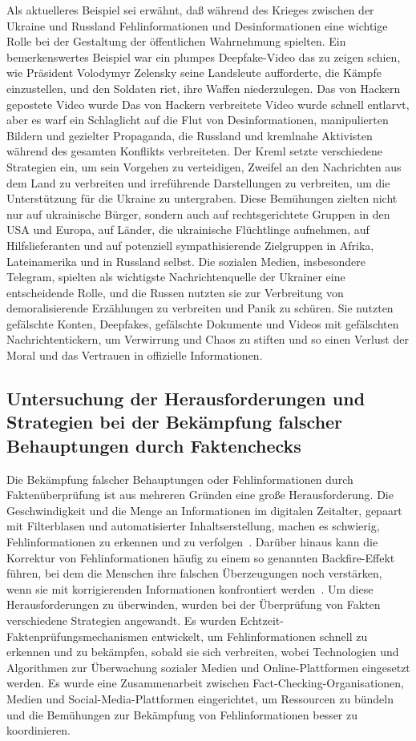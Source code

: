 \documentclass[a4paper,listof=totoc,bibliography=totoc]{scrartcl}
\begin{document}
Als aktuelleres Beispiel sei erwähnt, daß während des Krieges zwischen der Ukraine und Russland Fehlinformationen und Desinformationen eine wichtige Rolle bei der Gestaltung der 
öffentlichen Wahrnehmung spielten. Ein bemerkenswertes Beispiel war ein plumpes Deepfake-Video das zu zeigen schien, wie Präsident Volodymyr Zelensky seine Landsleute aufforderte, die Kämpfe 
einzustellen, und den Soldaten riet, ihre Waffen niederzulegen. Das von Hackern gepostete Video wurde Das von Hackern verbreitete Video wurde schnell entlarvt, aber es warf ein Schlaglicht 
auf die Flut von Desinformationen, manipulierten Bildern und gezielter Propaganda, die Russland und kremlnahe Aktivisten während des gesamten Konflikts verbreiteten. Der Kreml setzte 
verschiedene Strategien ein, um sein Vorgehen zu verteidigen, Zweifel an den Nachrichten aus dem Land zu verbreiten und irreführende Darstellungen zu verbreiten, um die Unterstützung 
für die Ukraine zu untergraben. Diese Bemühungen zielten nicht nur auf ukrainische Bürger, sondern auch auf rechtsgerichtete Gruppen in den USA und Europa, auf Länder, die ukrainische 
Flüchtlinge aufnehmen, auf Hilfslieferanten und auf potenziell sympathisierende Zielgruppen in Afrika, Lateinamerika und in Russland selbst. Die sozialen Medien, insbesondere 
Telegram, spielten als wichtigste Nachrichtenquelle der Ukrainer eine entscheidende Rolle, und die Russen nutzten sie zur Verbreitung von demoralisierende Erzählungen zu verbreiten 
und Panik zu schüren. Sie nutzten gefälschte Konten, Deepfakes, gefälschte Dokumente und Videos mit gefälschten Nachrichtentickern, um Verwirrung und Chaos zu stiften und so einen 
Verlust der Moral und das Vertrauen in offizielle Informationen.

\subsection{Untersuchung der Herausforderungen und Strategien bei der Bekämpfung falscher Behauptungen durch Faktenchecks}

Die Bekämpfung falscher Behauptungen oder Fehlinformationen durch Faktenüberprüfung ist aus mehreren Gründen eine große Herausforderung. Die Geschwindigkeit und die 
Menge an Informationen im digitalen Zeitalter, gepaart mit Filterblasen und automatisierter Inhaltserstellung, machen es schwierig, Fehlinformationen zu erkennen und 
zu verfolgen~\cite{lewandowsky2020}. Darüber hinaus kann die Korrektur von Fehlinformationen häufig zu einem so genannten Backfire-Effekt führen, bei dem die 
Menschen ihre falschen Überzeugungen noch verstärken, wenn sie mit korrigierenden Informationen konfrontiert werden~\cite{nyhan2010}. Um diese Herausforderungen zu 
überwinden, wurden bei der Überprüfung von Fakten verschiedene Strategien angewandt. Es wurden Echtzeit-Faktenprüfungsmechanismen entwickelt, um Fehlinformationen 
schnell zu erkennen und zu bekämpfen, sobald sie sich verbreiten, wobei Technologien und Algorithmen zur Überwachung sozialer Medien und Online-Plattformen 
eingesetzt werden. Es wurde eine Zusammenarbeit zwischen Fact-Checking-Organisationen, Medien und Social-Media-Plattformen eingerichtet, um Ressourcen zu bündeln 
und die Bemühungen zur Bekämpfung von Fehlinformationen besser zu koordinieren.\newline
\end{document}
